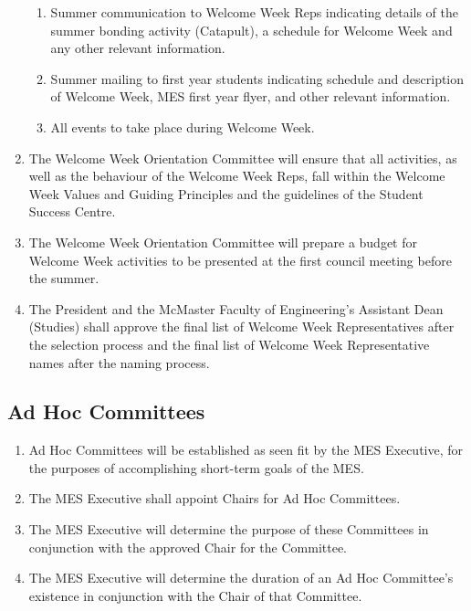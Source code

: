 \begin{enumerate}
  \begin{enumerate}
   \item
    Summer communication to Welcome Week Reps indicating details of the
    summer bonding activity (Catapult), a schedule for Welcome Week and
    any other relevant information.
   \item
    Summer mailing to first year students indicating schedule and
    description of Welcome Week, MES first year flyer, and other
    relevant information.
   \item
    All events to take place during Welcome Week.
  \end{enumerate}
 \item
  The Welcome Week Orientation Committee will ensure that all
  activities, as well as the behaviour of the Welcome Week Reps, fall
  within the Welcome Week Values and Guiding Principles and the
  guidelines of the Student Success Centre.
 \item
  The Welcome Week Orientation Committee will prepare a budget for
  Welcome Week activities to be presented at the first council meeting
  before the summer.
 \item
  The President and the McMaster Faculty of Engineering's Assistant Dean
  (Studies) shall approve the final list of Welcome Week Representatives
  after the selection process and the final list of Welcome Week
  Representative names after the naming process.

\end{enumerate}

\subsection{Ad Hoc Committees}
\label{ad-hoc-committees}
\begin{enumerate}
 \item
  Ad Hoc Committees will be established as seen fit by the MES
  Executive, for the purposes of accomplishing short-term goals of the
  MES.
 \item
  The MES Executive shall appoint Chairs for Ad Hoc Committees.
 \item
  The MES Executive will determine the purpose of these Committees in
  conjunction with the approved Chair for the Committee.
 \item
  The MES Executive will determine the duration of an Ad Hoc Committee's
  existence in conjunction with the Chair of that Committee.

\end{enumerate}

